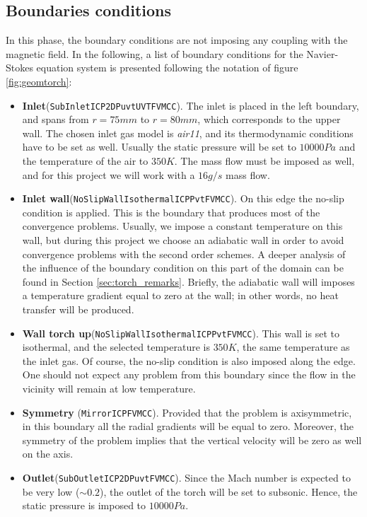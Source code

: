 \documentclass[11pt]{article}
\begin{document}
\subsection{Boundaries conditions}
In this phase, the boundary conditions are not imposing any coupling with the magnetic field. 
In the following, a list of boundary conditions for the Navier-Stokes equation system is presented following the notation of figure \ref{fig:geomtorch}:
\begin{itemize}
\item \textbf{Inlet}(\texttt{SubInletICP2DPuvtUVTFVMCC}). The inlet is placed in the left boundary, and spans from $r=75 mm$ to $r=80 mm$, which corresponds to the upper wall. The chosen inlet gas model is \emph{air11},
 and its thermodynamic conditions have to be set as well. Usually the static pressure will be set to $10000Pa$ and the temperature of the air to $350K$. The mass flow must be imposed as well, 
and for this project we will work with a $16g/s$ mass flow.
\item \textbf{Inlet wall}(\texttt{NoSlipWallIsothermalICPPvtFVMCC}). On this edge the no-slip condition is applied. This is the boundary that produces most of the convergence problems. Usually, we impose a constant temperature on this wall,
 but during this project we choose an adiabatic wall in order to avoid convergence problems with the second order schemes. A deeper analysis of the influence of the boundary condition on this part  of the domain can be found in Section \ref{sec:torch_remarks}. Briefly, the adiabatic wall will imposes a temperature gradient equal to zero at the wall; in other words, no heat transfer will be
 produced. 
\item \textbf{Wall torch up}(\texttt{NoSlipWallIsothermalICPPvtFVMCC}). This wall is set to isothermal, and the selected temperature is $350K$, the same temperature as the inlet gas. Of course, the no-slip condition is also imposed along
 the edge. One should not expect any problem from this boundary since the flow in the vicinity will remain at low temperature.
\item \textbf{Symmetry} (\texttt{MirrorICPFVMCC}). Provided that the problem is axisymmetric, in this boundary all the radial gradients will be equal to zero. Moreover, the symmetry of the problem implies that the vertical
 velocity will be zero as well on the axis.
\item \textbf{Outlet}(\texttt{SubOutletICP2DPuvtFVMCC}). Since the Mach number is expected to be very low ($\sim 0.2$), the outlet of the torch will be set to subsonic. Hence, the static pressure is imposed to $10000Pa$.
\end{itemize}
\end{document}
